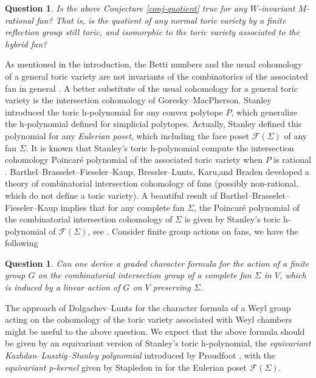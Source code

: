 \documentclass{amsart}
\newtheorem{question}[theorem]{Question}
\theoremstyle{definition}
\theoremstyle{remark}
\numberwithin{equation}{section}
\begin{document}
\begin{question} \label{question-quotient}
    Is the above Conjecture \ref{conj-quotient} true for any $W$-invariant $M$-rational fan? That is, is the quotient of any normal toric variety by a finite reflection group still toric, and isomorphic to the toric variety associated to the hybrid fan?
\end{question}

As mentioned in the introduction, the Betti numbers and the usual cohomology of a general toric variety are not invariants of the combinatorics of the associated fan in general \cite{mcconnell1989rational}. A better substitute of the usual cohomology for a general toric variety is the intersection cohomology of Goresky--MacPherson\cite{goresky1980intersection,goresky1983intersection}. Stanley\cite{stanley1987generalized} introduced the toric h-polynomial for any convex polytope $P$, which generalize the h-polynomial defined for simplicial polytopes. Actually, Stanley defined this polynomial for any \emph{Eulerian poset}, which including the face poset $\mathcal{F}(\Sigma)$ of any fan $\Sigma$. It is known that Stanley's toric h-polynomial compute the intersection cohomology Poincar\'e polynomial of the associated toric variety when $P$ is rational \cite{denef1991weights,fieseler1991rational}. Barthel--Brasselet--Fieseler--Kaup\cite{barthel2002combinatorial}, Bressler--Lunts\cite{bressler2003intersection}, Karu\cite{karu2004hard},and  Braden\cite{braden2006remarks} developed a theory of combinatorial intersection cohomology of fans (possibly non-rational, which do not define a toric variety). A beautiful result of Barthel--Brasselet--Fieseler--Kaup implies that for any complete fan $\Sigma$, the Poincar\'e polynomial of the combinatorial intersection cohomology of $\Sigma$ is given by Stanley's toric h-polynomial of $\mathcal{F}(\Sigma)$, see \cite[Theorem 3.2]{braden2006remarks}. Consider finite group actions on fans, we have the following 

\begin{question} \label{ques--GCF for CIH}
    Can one derive a graded character formula for the action of a finite group $G$ on the combinatorial intersection group of a complete fan $\Sigma$ in $V$, which is induced by a linear action of $G$ on $V$ preserving $\Sigma$.
\end{question}

The approach of Dolgachev--Lunts\cite{dolgachev1994character} for the character formula of a Weyl group acting on the cohomology of the toric variety associated with Weyl chambers might be useful to the above question. We expect that the above formula should be given by an equivariant version of Stanley's toric h-polynomial, the \emph{equivariant Kazhdan--Lusztig--Stanley polynomial} introduced by Proudfoot \cite{proudfoot2021equivariant}, with the \emph{equivariant p-kernel} given by Stapledon in \cite[Example 1.7]{stapledon2025subdivisions} for the Eulerian poset $\mathcal{F}(\Sigma)$.  
\end{document}
